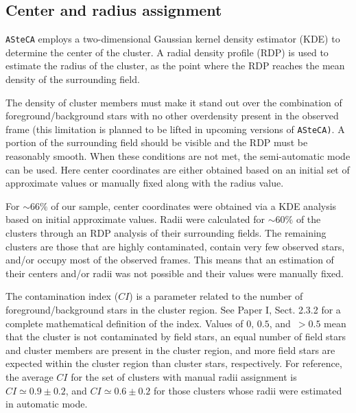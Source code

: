 \documentclass{aa}
\begin{document}

\subsection{Center and radius assignment}
\label{ssec:centre-radius}

\texttt{ASteCA} employs a two-dimensional Gaussian kernel density estimator 
(KDE) to determine the center of the cluster. A radial density profile (RDP) is
used to estimate the radius of the cluster, as the point where the RDP reaches the
mean density of the surrounding field.

The density of cluster members must make it stand out over the combination of
foreground/background stars with no other overdensity present in the observed
frame (this limitation is planned to be lifted in upcoming versions of
\texttt{ASteCA)}. A portion of the surrounding field should be visible and the
RDP must be reasonably smooth.
%
When these conditions are not met, the semi-automatic mode can be used. Here
center coordinates are either obtained based on an initial set of approximate
values or manually fixed along with the radius value.

For ${\sim}66\%$ of our sample, center coordinates were obtained via a KDE
analysis based on initial approximate values. Radii were calculated for
${\sim}60\%$ of the clusters through an RDP analysis of their surrounding
fields.
%
The remaining clusters are those that are highly contaminated, contain very few
observed stars, and/or occupy most of the observed frames. This means that an
estimation of their centers and/or radii was not possible and their values
were manually fixed.

The contamination index ($CI$) is a parameter related to the number of
foreground/background stars in the cluster region. See Paper
I, Sect. 2.3.2 for a complete mathematical definition of the index.
Values of $0,\,0.5$, and $\,{>}0.5$ mean that the cluster is not
contaminated by field stars, an equal number of field stars and cluster
members are present in the cluster region, and more field stars are
expected within the cluster region than cluster stars, respectively.
%
For reference, the average $CI$ for the set of clusters with manual radii
assignment is $CI{\simeq}0.9{\pm}0.2$, and $CI{\simeq}0.6\pm0.2$ for those
clusters whose radii were estimated in automatic mode.
\end{document}

